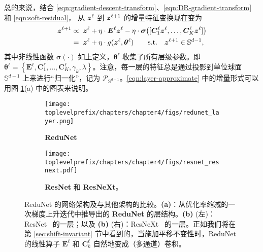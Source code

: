 \documentclass[../../book-main_zh.tex]{subfiles}
\begin{document}
总的来说，结合 \eqref{eqn:gradient-descent-transform}、\eqref{eqn:DR-gradient-transform} 和 \eqref{eqn:soft-residual}，
从 $\bm{z}^{\ell}$ 到 $\bm{z}^{\ell+1}$ 的增量特征变换现在变为
\begin{equation}\label{eqn:layer-approximate}
\begin{aligned}
\bm{z}^{\ell+1}  &\propto \; \bm{z}^\ell +  \eta \cdot  \bm E^{\ell} \bm{z}^{\ell} - \eta\cdot  \bm \sigma\big([\bm{C}^{\ell}_{1} \bm{z}^{\ell}, \dots, \bm{C}^{\ell}_{K} \bm{z}^{\ell}]\big)  \\
&= \; \bm{z}^\ell +  \eta \cdot g(\bm{z}^\ell, \bm \theta^\ell) \qquad \mbox{s.t.} \quad \bm{z}^{\ell +1} \in \mathbb{S}^{d-1},
\end{aligned}
\end{equation}
其中非线性函数 $\bm \sigma(\cdot)$ 如上定义，$\bm \theta^\ell$ 收集了所有层级参数。即 $\bm \theta^\ell =\left\{\bm E^\ell, \bm{C}^{\ell}_{1}, \dots, \bm{C}^{\ell}_{K}, \gamma_{k}, \lambda\right\}$。注意，每一层的特征总是通过投影到单位球面 $\mathbb S^{d-1}$ 上来进行“归一化”，记为 $\mathcal P_{\mathbb S^{d-1}}$。\eqref{eqn:layer-approximate} 中的增量形式可以用图 \ref{fig:arch-ReduNet}(a) 中的图表来说明。

\begin{figure}[t]
    \begin{subfigure}[t]{0.35\textwidth}
        \centering
        \texttt{[image: \\toplevelprefix/chapters/chapter4/figs/redunet\_layer.png]}
        \caption{\textbf{ReduNet}}
    \end{subfigure}
    \hfill
    \begin{subfigure}[t]{0.6\textwidth}
        \centering
        \texttt{[image: \\toplevelprefix/chapters/chapter4/figs/resnet\_resnext.pdf]}
        \caption{\textbf{ResNet} 和 \textbf{ResNeXt}。}
    \end{subfigure}
    \caption{\small ReduNet 的网络架构及与其他架构的比较。\textbf{(a)}：从优化率缩减的一次梯度上升迭代中推导出的 \textbf{ReduNet} 的层结构。\textbf{(b)} (左)：ResNet~\cite{he2016deep} 的一层；以及 \textbf{(b)} (右)：ResNeXt~\cite{ResNEXT} 的一层。正如我们将在第 \ref{sec:shift-invariant} 节中看到的，当施加平移不变性时，ReduNet 的线性算子 $\bm E^\ell$ 和 $\bm{C}_k^\ell$ 自然地变成（多通道）卷积。}
    \label{fig:arch-ReduNet}
\end{figure}
\end{document}
